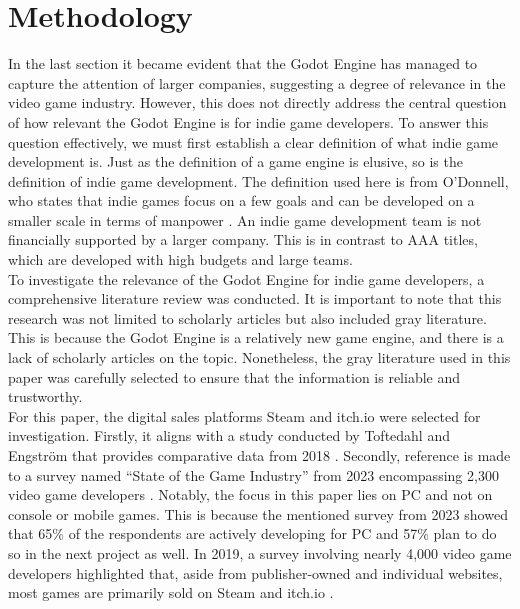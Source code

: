 \section{Methodology}
In the last section it became evident that the Godot Engine has managed to capture the attention of larger companies, suggesting a degree of relevance in the video game industry.
However, this does not directly address the central question of how relevant the Godot Engine is for indie game developers.
To answer this question effectively, we must first establish a clear definition of what indie game development is.
Just as the definition of a game engine is elusive, so is the definition of indie game development.
The definition used here is from O'Donnell, who states that indie games focus on a few goals and can be developed on a smaller scale in terms of manpower \cite{indie-definition}.
An indie game development team is not financially supported by a larger company.
This is in contrast to AAA titles, which are developed with high budgets and large teams.\\

To investigate the relevance of the Godot Engine for indie game developers, a comprehensive literature review was conducted.
It is important to note that this research was not limited to scholarly articles but also included gray literature.
This is because the Godot Engine is a relatively new game engine, and there is a lack of scholarly articles on the topic.
Nonetheless, the gray literature used in this paper was carefully selected to ensure that the information is reliable and trustworthy. \\ 

For this paper, the digital sales platforms Steam and itch.io were selected for investigation.
Firstly, it aligns with a study conducted by Toftedahl and Engström that provides comparative data from 2018 \cite{game-engine-taxonomy}.
Secondly, reference is made to a survey named ``State of the Game Industry'' from 2023 encompassing 2,300 video game developers \cite{gdc-2023}.
Notably, the focus in this paper lies on PC and not on console or mobile games.
This is because the mentioned survey from 2023 showed that 65\% of the respondents are actively developing for PC and 57\% plan to do so in the next project as well.
In 2019, a survey involving nearly 4,000 video game developers highlighted that, aside from publisher-owned and individual websites, most games are primarily sold on Steam and itch.io \cite{gdc-2019}.\\

